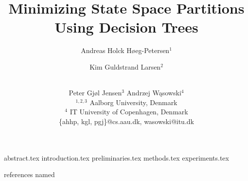 \documentclass{article}
\title {Minimizing State Space Partitions Using Decision Trees}
\author {%
    Andreas Holck Høeg-Petersen$^1$
    \and
    Kim Guldstrand Larsen$^2$\and\\
    Peter Gjøl Jensen$^{3}$\And
    Andrzej Wąsowski$^4$\\
    \affiliations
    $^{1,2,3}$ Aalborg University, Denmark\\
    $^4$ IT University of Copenhagen, Denmark\\
    \emails
    \{ahhp, kgl, pgj\}@cs.aau.dk,
    wasowski@itu.dk
}
\begin{document}
\maketitle

 {abstract.tex}
 {introduction.tex}
 {preliminaries.tex}
 {methods.tex}
 {experiments.tex}

\newpage

 {references}
 {named}


\end{document}
